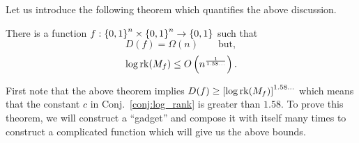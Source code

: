 \documentclass[usletter]{article}
\providecommand\rbrac[1]{\ensuremath \left(#1\right)}
\providecommand\sqbrac[1]{\ensuremath \left[#1\right]}
\providecommand\cbrac[1]{\ensuremath \left\{#1\right\}}
\providecommand{\bigo}{O}
\newcommand{\rk}{\mathrm{rk}}
\newcommand{\mf}{M_f}
\newcommand{\df}{D(f)}
\begin{document}
Let us introduce the following theorem which quantifies the above discussion.
\begin{theorem}
\label{thm:log_rank_bound}
There is a function $f: \cbrac{0,1}^n \times \cbrac{0,1}^n \to \cbrac{0,1}$ such that
$$
\df = \Omega(n) \qquad \mathrm{but},
$$
$$
\log \rk (\mf) \leq \bigo\rbrac{n^{\frac{1}{1.58\ldots}}}.
$$
\end{theorem}
\begin{remark}
First note that the above theorem implies $\df \geq \sqbrac{\log \rk (\mf)}^{1.58\ldots}$ which means that the constant $c$ in Conj.~\ref{conj:log_rank} is greater than $1.58$. To prove this theorem, we will construct a ``gadget'' and compose it with itself many times to construct a complicated function which will give us the above bounds.
\end{remark}
\end{document}
